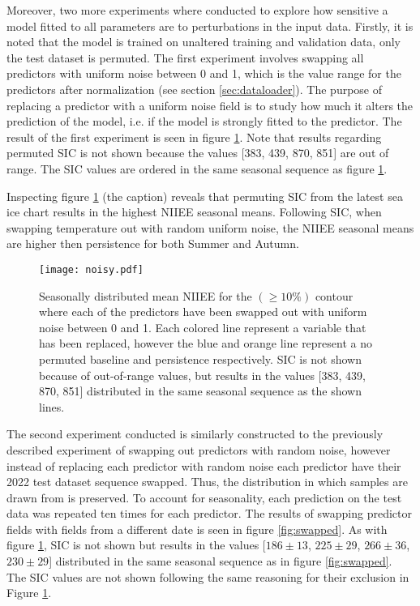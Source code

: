 \documentclass[../main/thesis.tex]{subfiles}
\begin{document}
Moreover, two more experiments where conducted to explore how sensitive a model fitted to all parameters are to perturbations in the input data. Firstly, it is noted that the model is trained on unaltered training and validation data, only the test dataset is permuted. The first experiment involves swapping all predictors with uniform noise between 0 and 1, which is the value range for the predictors after normalization (see section \ref{sec:dataloader}). The purpose of replacing a predictor with a uniform noise field is to study how much it alters the prediction of the model, i.e. if the model is strongly fitted to the predictor. The result of the first experiment is seen in figure \ref{fig:noisy}. Note that results regarding permuted SIC is not shown because the values [383, 439, 870, 851] are out of range. The SIC values are ordered in the same seasonal sequence as figure \ref{fig:noisy}.

Inspecting figure \ref{fig:noisy} (the caption) reveals that permuting SIC from the latest sea ice chart results in the highest NIIEE seasonal means. Following SIC, when swapping temperature out with random uniform noise, the NIIEE seasonal means are higher then persistence for both Summer and Autumn. 

\begin{figure}
    \centering
    \texttt{[image: noisy.pdf]}
    \caption{\label{fig:noisy}Seasonally distributed mean NIIEE for the $(\geq10\%)$ contour where each of the predictors have been swapped out with uniform noise between 0 and 1. Each colored line represent a variable that has been replaced, however the blue and orange line represent a no permuted baseline and persistence respectively. SIC is not shown because of out-of-range values, but results in the values [383, 439, 870, 851] distributed in the same seasonal sequence as the shown lines.}
\end{figure}

The second experiment conducted is similarly constructed to the previously described experiment of swapping out predictors with random noise, however instead of replacing each predictor with random noise each predictor have their 2022 test dataset sequence swapped. Thus, the distribution in which samples are drawn from is preserved. To account for seasonality, each prediction on the test data was repeated ten times for each predictor. The results of swapping predictor fields with fields from a different date is seen in figure \ref{fig:swapped}. As with figure \ref{fig:noisy}, SIC is not shown but results in the values [$186 \pm 13$, $225 \pm 29$, $266 \pm 36$, $230 \pm 29$] distributed in the same seasonal sequence as in figure \ref{fig:swapped}. The SIC values are not shown following the same reasoning for their exclusion in Figure \ref{fig:noisy}.
\end{document}
